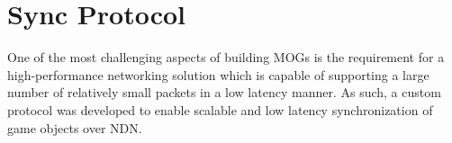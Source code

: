 \section{\game{} Sync Protocol}\label{sec:des:sync-protocol}
One of the most challenging aspects of building MOGs is the requirement for a high-performance networking solution which is capable of supporting a large number of relatively small packets in a low latency manner. As such, a custom protocol was developed to enable scalable and low latency synchronization of game objects over NDN.



